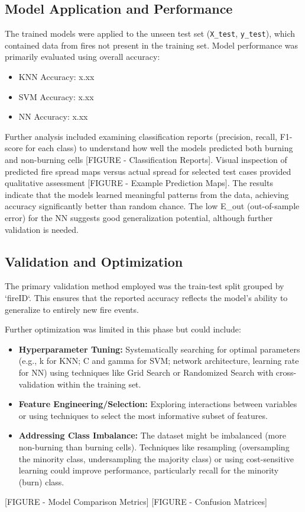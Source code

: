 \documentclass[conference]{IEEEtran}
\begin{document}
\subsection{Model Application and Performance}
The trained models were applied to the unseen test set (\texttt{X\_test}, \texttt{y\_test}), which contained data from fires not present in the training set. Model performance was primarily evaluated using overall accuracy:
\begin{itemize}
    \item KNN Accuracy: x.xx%
    \item SVM Accuracy: x.xx%
    \item NN Accuracy: x.xx%
\end{itemize}
Further analysis included examining classification reports (precision, recall, F1-score for each class) to understand how well the models predicted both burning and non-burning cells [FIGURE - Classification Reports]. Visual inspection of predicted fire spread maps versus actual spread for selected test cases provided qualitative assessment [FIGURE - Example Prediction Maps]. The results indicate that the models learned meaningful patterns from the data, achieving accuracy significantly better than random chance. The low E\_out (out-of-sample error) for the NN suggests good generalization potential, although further validation is needed.

\subsection{Validation and Optimization}
The primary validation method employed was the train-test split grouped by `fireID`. This ensures that the reported accuracy reflects the model's ability to generalize to entirely new fire events.

Further optimization was limited in this phase but could include:
\begin{itemize}
    \item \textbf{Hyperparameter Tuning:} Systematically searching for optimal parameters (e.g., k for KNN; C and gamma for SVM; network architecture, learning rate for NN) using techniques like Grid Search or Randomized Search with cross-validation within the training set.
    \item \textbf{Feature Engineering/Selection:} Exploring interactions between variables or using techniques to select the most informative subset of features.
    \item \textbf{Addressing Class Imbalance:} The dataset might be imbalanced (more non-burning than burning cells). Techniques like resampling (oversampling the minority class, undersampling the majority class) or using cost-sensitive learning could improve performance, particularly recall for the minority (burn) class.
\end{itemize}
[FIGURE - Model Comparison Metrics]
[FIGURE - Confusion Matrices]
\end{document}
